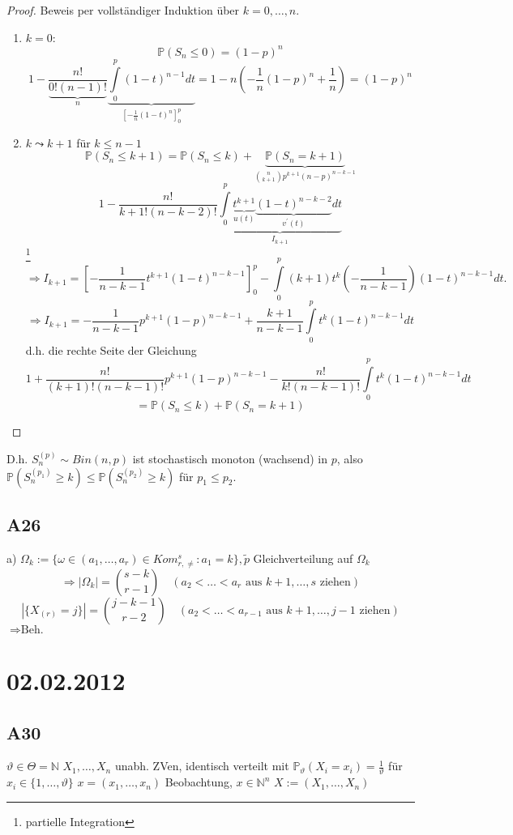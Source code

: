 \documentclass[a4paper,11pt,notitlepage]{report}
\newcommand{\N}{{\ensuremath{\mathbb{N}}}}
\newcommand{\Prim}{{\ensuremath{\mathbb{P}}}}
\begin{document}
\begin{proof}
	Beweis per vollständiger Induktion über $k = 0, \ldots, n$.
	\begin{enumerate}
		\item $k=0$:
		$$\Prim(S_n \leq 0) = (1-p)^n$$
		$$1- \frac{n!}{\underbrace{0!(n-1)!}_{n}} \underbrace{\int\limits_{0}^p{(1-t)^{n-1} dt}}_{[-\frac{1}{n}(1-t)^n]_0^p} = 1-n(-\frac{1}{n} (1-p)^n + \frac{1}{n}) = (1-p)^n$$
		\item $k \leadsto k+1$ für $k \leq n-1$
		$$\Prim(S_n \leq k+1) = \Prim(S_n \leq k) + \underbrace{\Prim(S_n = k+1)}_{{n \choose k+1} p^{k+1} (n-p)^{n-k-1}}$$
		$$1- \frac{n!}{k+1!(n-k-2)!} \underbrace{\int\limits_{0}^p{\underbrace{t^{k+1}}_{u(t)} \underbrace{(1-t)^{n-k-2}}_{v^\prime(t)} dt}}_{I_{k+1}}$$ \footnote{partielle Integration}
		$$\Rightarrow I_{k+1} = [- \frac{1}{n-k-1} t^{k+1} (1-t)^{n-k-1}]_0^p - \int\limits_0^p{(k+1)t^k(- \frac{1}{n-k-1}) (1-t)^{n-k-1} dt.}$$
		$$\Rightarrow I_{k+1} = - \frac{1}{n-k-1}p^{k+1}(1-p)^{n-k-1} + \frac{k+1}{n-k-1} \int\limits_0^p{t^k (1-t)^{n-k-1} dt}$$
		d.h. die rechte Seite der Gleichung
		$$1 + \frac{n!}{(k+1)!(n-k-1)!} p^{k+1} (1-p)^{n-k-1} - \frac{n!}{k!(n-k-1)!} \int\limits_0^p{t^k (1-t)^{n-k-1} dt}$$
		$$= \Prim(S_n \leq k) + \Prim(S_n = k+1)$$
	\end{enumerate}
\end{proof}

D.h. $S_n^{(p)} \sim Bin(n,p)$ ist stochastisch monoton (wachsend) in $p$, also $\Prim(S_n^{(p_1)} \geq k) \leq \Prim(S_n^{(p_2)} \geq k)$ für $p_1 \leq p_2.$

\section{A26}
a) $\Omega_k := \{ \omega \in (a_1, \ldots, a_r) \in Kom_{r, \neq}^s \colon a_1 = k\}, \widetilde{p}$ Gleichverteilung auf $\Omega_k$
$$\Rightarrow |\Omega_k| = {s-k \choose r-1} \quad (a_2 < \ldots < a_r \text{ aus } k+1, \ldots,s \text{ ziehen})$$
$$|\{X_{(r)} = j\}| = {j-k-1 \choose r-2} \quad (a_2 < \ldots < a_{r-1} \text{ aus } k+1, \ldots, j-1 \text{ ziehen})$$
$\Rightarrow \text{Beh.}$

\chapter{02.02.2012}
\section{A30}
$\vartheta \in \Theta = \N$
\newline
$X_1, \ldots, X_n$ unabh. ZVen, identisch verteilt mit $\Prim_\vartheta(X_i = x_i) = \frac{1}{\vartheta}$ für $x_i \in \{1, \ldots, \vartheta\}$ \newline
$x = (x_1, \ldots, x_n)$ Beobachtung, $x \in \N^n$ \newline
$X := (X_1, \ldots, X_n)$
\end{document}
